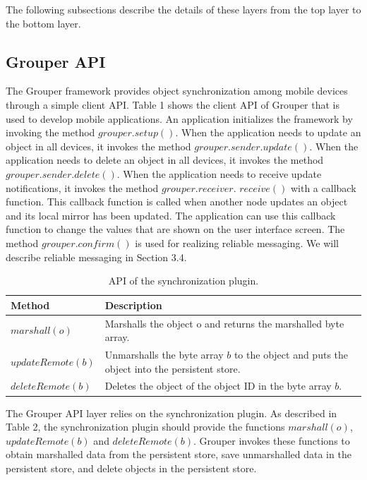 \documentclass{sig-alternate-05-2015}
\begin{document}
The following subsections describe the details of these layers from the top layer to the bottom layer.

\subsection{Grouper API}

The Grouper framework provides object synchronization among mobile devices through a simple client API.
Table 1 shows the client API of Grouper that is used to develop mobile applications.
An application initializes the framework by invoking the method $grouper.setup()$.
When the application needs to update an object in all devices, it invokes the method $grouper.sender.update()$.
When the application needs to delete an object in all devices, it invokes the method $grouper.sender.delete()$.
When the application needs to receive update notifications, it invokes the method $grouper.receiver.$ $receive()$ with a callback function.
This callback function is called when another node updates an object and its local mirror has been updated.
The application can use this callback function to change the values that are shown on the user interface screen.
The method $grouper.confirm()$ is used for realizing reliable messaging.
We will describe reliable messaging in Section 3.4.

\begin{table}[t]
	\centering
	\caption{API of the synchronization plugin.}
	\begin{tabular}{ll}
		\hline
		\textbf{Method} & \textbf{Description} \\ \hline
		$marshall(o)$ & Marshalls the object o and returns the marshalled byte array. \\
		$updateRemote(b)$ & Unmarshalls the byte array $b$ to the object and puts the object into the persistent store. \\ 
		$deleteRemote(b)$ & Deletes the object of the object ID in the byte array $b$.\\ \hline
	\end{tabular}
\end{table}

The Grouper API layer relies on the synchronization plugin.
As described in Table 2, the synchronization plugin should provide the functions $marshall(o)$, $updateRemote(b)$ and $deleteRemote(b)$.
Grouper invokes these functions to obtain marshalled data from the persistent store, save unmarshalled data in the persistent store, and delete objects in the persistent store.
\end{document}
